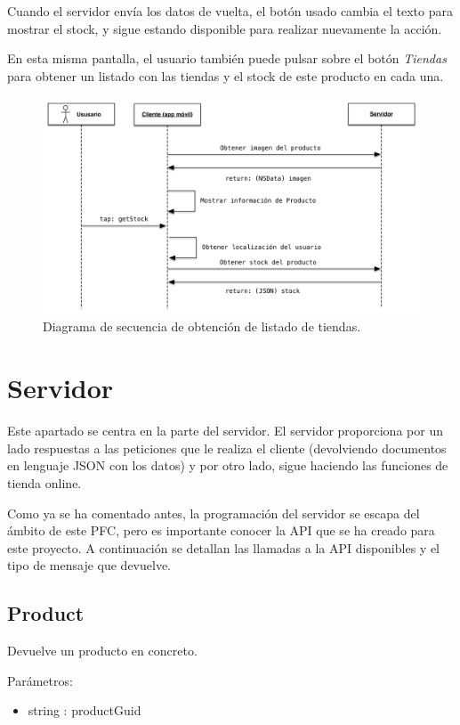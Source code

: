 Cuando el servidor envía los datos de vuelta, el botón usado cambia el texto para mostrar el stock, y sigue estando disponible para realizar nuevamente la acción.

En esta misma pantalla, el usuario también puede pulsar sobre el botón \emph{Tiendas} para obtener un listado con las tiendas y el stock de este producto en cada una.

\begin{figure}[H]
	\centering
		\includegraphics[width=1\textwidth]{./img/diagrama-get-stock.png}
	\caption{Diagrama de secuencia de obtención de listado de tiendas.}
	\label{fig:diagrama-tiendas}
\end{figure}

\section{Servidor}
Este apartado se centra en la parte del servidor. El servidor proporciona por un lado respuestas a las peticiones que le realiza el cliente (devolviendo documentos en lenguaje JSON con los datos) y por otro lado, sigue haciendo las funciones de tienda online.

Como ya se ha comentado antes, la programación del servidor se escapa del ámbito de este PFC, pero es importante conocer la API que se ha creado para este proyecto. A continuación se detallan las llamadas a la API disponibles y el tipo de mensaje que devuelve.

\subsection{Product}
Devuelve un producto en concreto.

Parámetros:
\begin{itemize}
	\item string : productGuid
\end{itemize}

